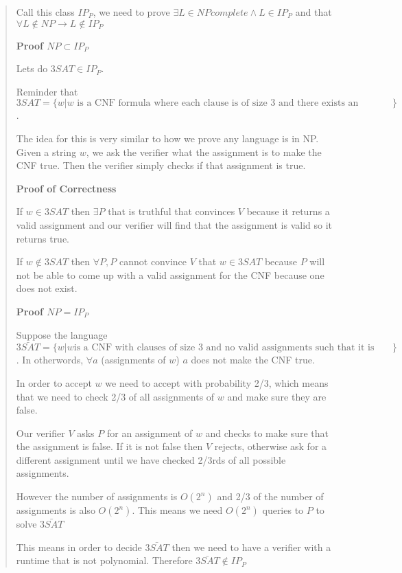 \documentclass[
  letterpaper,
  DIV=11,
  numbers=noendperiod]{scrartcl}
\begin{document}
\begin{quote}
Call this class \(IP_P\), we need to prove
\(\exists L\in NPcomplete \land L\in IP_P\) and that
\(\forall L \notin NP \rightarrow L\notin IP_P\)

\textbf{Proof \(NP \subset IP_P\)}

Lets do \(3SAT \in IP_P\).

Reminder that
\(3SAT= \{w| w \text{ is a CNF formula where each clause is of size 3 and there exists an assignment to make the CNF true}\}\).

The idea for this is very similar to how we prove any language is in NP.
Given a string \(w\), we ask the verifier what the assignment is to make
the CNF true. Then the verifier simply checks if that assignment is
true.

\textbf{Proof of Correctness}

If \(w\in 3SAT\) then \(\exists P\) that is truthful that convinces
\(V\) because it returns a valid assignment and our verifier will find
that the assignment is valid so it returns true.

If \(w\notin 3SAT\) then \(\forall P, P\) cannot convince \(V\) that
\(w\in 3SAT\) because \(P\) will not be able to come up with a valid
assignment for the CNF because one does not exist.

\textbf{Proof \(NP = IP_P\)}

Suppose the language
\(\bar{3SAT}=\{w|w\text{is a CNF with clauses of size 3 and no valid assignments such that it is true}\}\).
In otherwords, \(\forall a\) (assignments of \(w\)) \(a\) does not make
the CNF true.

In order to accept \(w\) we need to accept with probability 2/3, which
means that we need to check 2/3 of all assignments of \(w\) and make
sure they are false.

Our verifier \(V\) asks \(P\) for an assignment of \(w\) and checks to
make sure that the assignment is false. If it is not false then \(V\)
rejects, otherwise ask for a different assignment until we have checked
2/3rds of all possible assignments.

However the number of assignments is \(O(2^n)\) and 2/3 of the number of
assignments is also \(O(2^n)\). This means we need \(O(2^n)\) queries to
\(P\) to solve \(\bar{3SAT}\)

This means in order to decide \(\bar{3SAT}\) then we need to have a
verifier with a runtime that is not polynomial. Therefore
\(\bar{3SAT}\notin IP_P\)
\end{quote}
\end{document}
